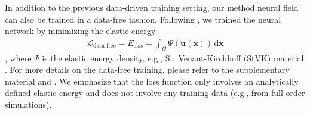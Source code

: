 In addition to the previous data-driven training setting, our method neural field can also be trained in a data-free fashion. Following \citet{Modi:2024:Simplicits}, we trained the neural network by minimizing the elastic energy 
\begin{align} \label{eq:training-data-free}
    \mathcal{L}_{\text{data-free}} = E_{\text{elas}} = \int_{\Omega}\Psi(\bm{u}(\bm{x})) \, \mathrm{d}\bm{x} 
\end{align}, where $\Psi$ is the elastic energy density, e.g., St. Venant-Kirchhoff (StVK) material \cite{barbivc2005real}. For more details on the data-free training, please refer to the supplementary material and \citep{Modi:2024:Simplicits}. We emphasize that the loss function only involves an analytically defined elastic energy and does not involve any training data (e.g., from full-order simulations).




















